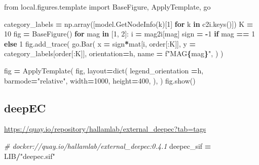 \documentclass[
]{book}
\newenvironment{Shaded}{\begin{snugshade}}{\end{snugshade}}
\newcommand{\BuiltInTok}[1]{#1}
\newcommand{\CommentTok}[1]{\textcolor[rgb]{0.56,0.35,0.01}{\textit{#1}}}
\newcommand{\ControlFlowTok}[1]{\textcolor[rgb]{0.13,0.29,0.53}{\textbf{#1}}}
\newcommand{\DecValTok}[1]{\textcolor[rgb]{0.00,0.00,0.81}{#1}}
\newcommand{\ImportTok}[1]{#1}
\newcommand{\KeywordTok}[1]{\textcolor[rgb]{0.13,0.29,0.53}{\textbf{#1}}}
\newcommand{\NormalTok}[1]{#1}
\newcommand{\OperatorTok}[1]{\textcolor[rgb]{0.81,0.36,0.00}{\textbf{#1}}}
\newcommand{\SpecialCharTok}[1]{\textcolor[rgb]{0.81,0.36,0.00}{\textbf{#1}}}
\newcommand{\SpecialStringTok}[1]{\textcolor[rgb]{0.31,0.60,0.02}{#1}}
\newcommand{\StringTok}[1]{\textcolor[rgb]{0.31,0.60,0.02}{#1}}
\begin{document}
\begin{Shaded}
\begin{Highlighting}[numbers=left,,]
\ImportTok{from}\NormalTok{ local.figures.template }\ImportTok{import}\NormalTok{ BaseFigure, ApplyTemplate, go}

\NormalTok{category\_labels }\OperatorTok{=}\NormalTok{ np.array([model.GetNodeInfo(k)[}\DecValTok{1}\NormalTok{] }\ControlFlowTok{for}\NormalTok{ k }\KeywordTok{in}\NormalTok{ c2i.keys()])}
\NormalTok{K }\OperatorTok{=} \DecValTok{10}
\NormalTok{fig }\OperatorTok{=}\NormalTok{ BaseFigure()}
\ControlFlowTok{for}\NormalTok{ mag }\KeywordTok{in}\NormalTok{ [}\DecValTok{1}\NormalTok{, }\DecValTok{2}\NormalTok{]:}
\NormalTok{    i }\OperatorTok{=}\NormalTok{ mag2i[mag]}
\NormalTok{    sign }\OperatorTok{=} \OperatorTok{{-}}\DecValTok{1} \ControlFlowTok{if}\NormalTok{ mag }\OperatorTok{==} \DecValTok{1} \ControlFlowTok{else} \DecValTok{1}
\NormalTok{    fig.add\_trace(}
\NormalTok{        go.Bar(}
\NormalTok{            x }\OperatorTok{=}\NormalTok{ sign}\OperatorTok{*}\NormalTok{mat[i, order[:K]],}
\NormalTok{            y }\OperatorTok{=}\NormalTok{ category\_labels[order[:K]],}
\NormalTok{            orientation}\OperatorTok{=}\StringTok{\textquotesingle{}h\textquotesingle{}}\NormalTok{,}
\NormalTok{            name }\OperatorTok{=} \SpecialStringTok{f"MAG}\SpecialCharTok{\{}\NormalTok{mag}\SpecialCharTok{\}}\SpecialStringTok{"}\NormalTok{,}
\NormalTok{        )}
\NormalTok{    )}

\NormalTok{fig }\OperatorTok{=}\NormalTok{ ApplyTemplate(}
\NormalTok{    fig,}
\NormalTok{    layout}\OperatorTok{=}\BuiltInTok{dict}\NormalTok{(}
\NormalTok{        legend\_orientation }\OperatorTok{=}\StringTok{\textquotesingle{}h\textquotesingle{}}\NormalTok{,}
\NormalTok{        barmode}\OperatorTok{=}\StringTok{"relative"}\NormalTok{,}
\NormalTok{        width}\OperatorTok{=}\DecValTok{1000}\NormalTok{, height}\OperatorTok{=}\DecValTok{400}\NormalTok{,}
\NormalTok{    ),}
\NormalTok{)}
\NormalTok{fig.show()}
\end{Highlighting}
\end{Shaded}

\subsection{deepEC}\label{deepec}

\url{https://quay.io/repository/hallamlab/external_deepec?tab=tags}

\begin{Shaded}
\begin{Highlighting}[numbers=left,,]
\CommentTok{\# docker://quay.io/hallamlab/external\_deepec:0.4.1}
\NormalTok{deepec\_sif }\OperatorTok{=}\NormalTok{ LIB}\OperatorTok{/}\StringTok{"deepec.sif"}
\end{Highlighting}
\end{Shaded}
\end{document}
